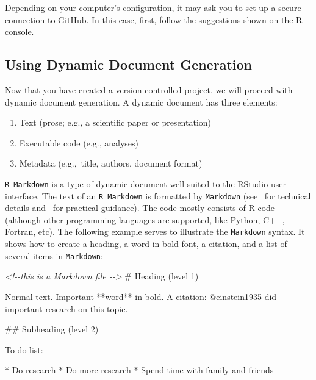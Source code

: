 \documentclass[psych,tutorial,accept,moreauthors,pdftex]{Definitions/mdpi}
\newenvironment{Shaded}{\begin{snugshade}}{\end{snugshade}}
\newcommand{\CommentTok}[1]{\textcolor[rgb]{0.56,0.35,0.01}{\textit{#1}}}
\newcommand{\FunctionTok}[1]{\textcolor[rgb]{0.00,0.00,0.00}{#1}}
\newcommand{\NormalTok}[1]{#1}
\newcommand{\SpecialStringTok}[1]{\textcolor[rgb]{0.31,0.60,0.02}{#1}}
\begin{document}
\begin{paracol}{2}
Depending on your computer's configuration, it may ask you to set up a
secure connection to GitHub. In this case, first, follow the suggestions
shown on the R console.

\subsection{Using Dynamic Document
Generation}\label{using-dynamic-document-generation}

Now that you have created a version-controlled project, we will proceed
with dynamic document generation. A dynamic document has three elements:

\begin{enumerate}
\def\labelenumi{\arabic{enumi}.}
\item
  Text (prose; e.g., a scientific paper or presentation)
\item
  Executable code (e.g., analyses)
\item
  Metadata (e.g.,~title, authors, document format)
\end{enumerate}

\texttt{R\ Markdown} is a type of dynamic document well-suited to the
RStudio user interface. The text of an \texttt{R\ Markdown} is formatted
by \texttt{Markdown} (see~\citep{xieMarkdownDefinitiveGuide2019} for
technical details and~\citep{xieMarkdownCookbook2020} for practical
guidance). The code mostly consists of R code (although other
programming languages are supported, like Python, C++, Fortran, etc).
The following example serves to illustrate the \texttt{Markdown} syntax.
It shows how to create a heading, a word in bold font, a citation, and a
list of several items in \texttt{Markdown}:


\begin{adjustwidth}{0.5cm}{0cm} 
\begin{Shaded}
\begin{Highlighting}[]
\CommentTok{\textless{}!{-}{-}this is a Markdown file {-}{-}\textgreater{}}
\FunctionTok{\# Heading (level 1)}

\NormalTok{Normal text.}
\NormalTok{Important **word** in bold.}
\NormalTok{A citation: @einstein1935 did important research on this topic.}

\FunctionTok{\#\# Subheading (level 2)}

\NormalTok{To do list:}

\SpecialStringTok{* }\NormalTok{Do research}
\SpecialStringTok{* }\NormalTok{Do more research}
\SpecialStringTok{* }\NormalTok{Spend time with family and friends}
\end{Highlighting}
\end{Shaded}
\end{adjustwidth}


\end{paracol}
\end{document}
